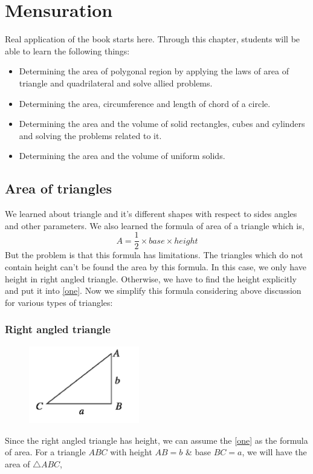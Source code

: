 \chapter{Mensuration}
Real application of the book starts here. Through this chapter, students will be able to learn the following things:
\begin{itemize}
	\item Determining the area of polygonal region by applying the laws of area of triangle and quadrilateral and solve allied problems.
	\item Determining the area, circumference and length of chord of a circle.
	\item Determining the area and the volume of solid rectangles, cubes and cylinders and solving the problems related to it.
	\item Determining the area and the volume of uniform solids.
\end{itemize}

\section{Area of triangles}
We learned about triangle and it's different shapes with respect to sides angles and other parameters. We also learned the formula of area of a triangle which is, 
\begin{equation}
	\label{one}
	A= \frac{1}{2}\times base \times height
\end{equation}
But the problem is that this formula has limitations. The triangles which do not contain height can't be found the area by this formula. In this case, we only have height in right angled triangle. Otherwise, we have to find the height explicitly and put it into \autoref{one}. Now we simplify this formula considering above discussion for various types of triangles:

\subsection{Right angled triangle}
\begin{figure}
	\includegraphics[width=1.9in]{pics/rat}
\end{figure}
Since the right angled triangle has height, we can assume the \autoref{one} as the formula of area. For a triangle $ABC$ with height $AB=b$ \& base $BC=a$, we will have the area of $\triangle ABC$,\\

